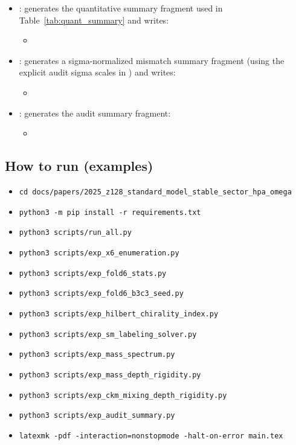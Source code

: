 \begin{sloppypar}
\begin{itemize}
\begin{itemize}
\item {}
\end{itemize}
\item {}: generates the quantitative summary fragment used in Table~\ref{tab:quant_summary} and writes:
\begin{itemize}
\item {}
\end{itemize}
\item {}: generates a sigma-normalized mismatch summary fragment (using the explicit audit sigma scales in ) and writes:
\begin{itemize}
\item {}
\end{itemize}
\item {}: generates the audit summary fragment:
\begin{itemize}
\item {}
\end{itemize}
\end{itemize}
\end{sloppypar}

\subsection{How to run (examples)}
\begin{itemize}
\item \texttt{cd docs/papers/2025\_z128\_standard\_model\_stable\_sector\_hpa\_omega}
\item \texttt{python3 -m pip install -r requirements.txt}
\item \texttt{python3 scripts/run\_all.py}
\item \texttt{python3 scripts/exp\_x6\_enumeration.py}
\item \texttt{python3 scripts/exp\_fold6\_stats.py}
\item \texttt{python3 scripts/exp\_fold6\_b3c3\_seed.py}
\item \texttt{python3 scripts/exp\_hilbert\_chirality\_index.py}
\item \texttt{python3 scripts/exp\_sm\_labeling\_solver.py}
\item \texttt{python3 scripts/exp\_mass\_spectrum.py}
\item \texttt{python3 scripts/exp\_mass\_depth\_rigidity.py}
\item \texttt{python3 scripts/exp\_ckm\_mixing\_depth\_rigidity.py}
\item \texttt{python3 scripts/exp\_audit\_summary.py}
\item \texttt{latexmk -pdf -interaction=nonstopmode -halt-on-error main.tex}
\end{itemize}

